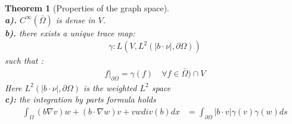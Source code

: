 \documentclass[a4paper,11pt,oneside,fleqn]{book}
\newtheorem{theorem}{Theorem}[section]
\theoremstyle{definition}
\theoremstyle{remark}
\begin{document}
\begin{theorem}[Properties of the graph space]\quad\\
	\textbf{a).} $C^\infty(\bar{\Omega})$ is dense in $V$. \\
	\textbf{b).} there exists a unique trace map:
	\begin{align*}
		\gamma: L(V, L^2(|b \cdot 
		\nu|, \partial \Omega))
	\end{align*}
	such that :
	\begin{align*}
		f|_{\partial\Omega} = \gamma(f) \quad \forall f \in \bar{\Omega}) \cap V
	\end{align*}
	Here $L^2(|b \cdot \nu|, \partial \Omega)$ is the weighted $L^2$ space \\
	\textbf{c):} the integration by parts formula holds
	\begin{align*}
		\int_\Omega (b \nabla v ) w + (b \cdot \nabla w) v + vw div( b) dx 
		&= \int_{\partial \Omega} | b \cdot v | \gamma (v) \gamma(w) ds
	\end{align*}	
\end{theorem}
\end{document}

